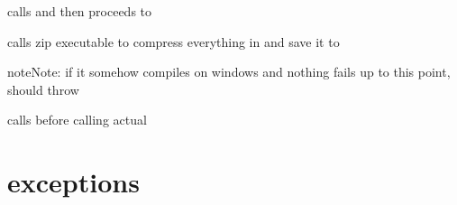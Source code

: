 \documentclass[letterpaper,10pt,english]{sphinxmanual}
\begin{document}

\begin{fulllineitems}
\label{epub:mobi2epub::save_to_directory__ss}
calls {\hyperref[epub:mobi2epub::set_out__ssR]{}} and
then proceeds to {\hyperref[epub:mobi2epub::save_to_directoryC]{}}

\end{fulllineitems}


\begin{fulllineitems}
\label{epub:mobi2epub::directory_to_epubC}
calls zip executable to compress everything in {\hyperref[epub:path_tmp__boost::filesystem::path]{}}
and save it to {\hyperref[epub:path_out__boost::filesystem::path]{}}

\begin{notice}{note}{Note:}
if it somehow compiles on windows and nothing fails up to this point, should throw {\hyperref[exceptions:epub::terrible_operating_system_exception]{}}
\end{notice}

\end{fulllineitems}


\begin{fulllineitems}
\label{epub:mobi2epub::directory_to_epub__ss}
calls {\hyperref[epub:mobi2epub::set_out__ssR]{}} before calling actual {\hyperref[epub:mobi2epub::directory_to_epubC]{}}

\end{fulllineitems}



\chapter{exceptions}
\label{exceptions:exceptions}\label{exceptions::doc}
\end{document}
